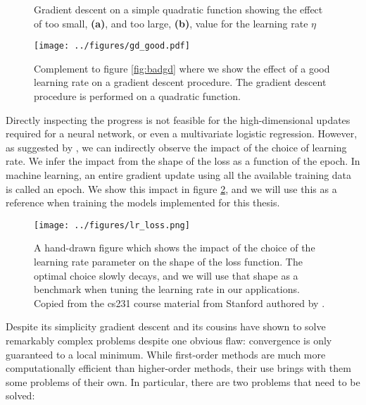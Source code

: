 \begin{figure}
\centering
\caption[Sub-optimal gradient descent]{Gradient descent on a simple quadratic function showing the effect of too small, \textbf{(a)}, and too large, \textbf{(b)}, value for the learning rate $\eta$}\label{fig:badgd}
\texttt{[image: ../figures/gd\_good.pdf]}
\caption[Optimal gradient descent]{Complement to figure \ref{fig:badgd} where we show the effect of a good learning rate on a gradient descent procedure. The gradient descent procedure is performed on a quadratic function.}\label{fig:goodgd}
\end{figure}

Directly inspecting the progress is not feasible for the high-dimensional updates required for a neural network, or even a multivariate logistic regression. However, as suggested by \citet{Karpathy}, we can indirectly observe the impact of the choice of learning rate. We infer the impact from the shape of the loss as a function of the epoch. In machine learning, an entire gradient update using all the available training data is called an epoch. We show this impact in figure \ref{fig:lrloss}, and we will use this as a reference when training the models implemented for this thesis. 

\begin{figure}
\centering
\texttt{[image: ../figures/lr\_loss.png]}
\caption[The impact of $\eta$ on performance]{A hand-drawn figure which shows the impact of the choice of the learning rate parameter on the shape of the loss function. The optimal choice slowly decays, and we will use that shape as a benchmark when tuning the learning rate in our applications. Copied from the cs231 course material from Stanford authored by \citet{Karpathy}.}\label{fig:lrloss}

\end{figure} 

Despite its simplicity gradient descent and its cousins have shown to solve remarkably complex problems despite one obvious flaw: convergence is only guaranteed to a local minimum. While first-order methods are much more computationally efficient than higher-order methods, their use brings with them some problems of their own. In particular, there are two problems that need to be solved:


